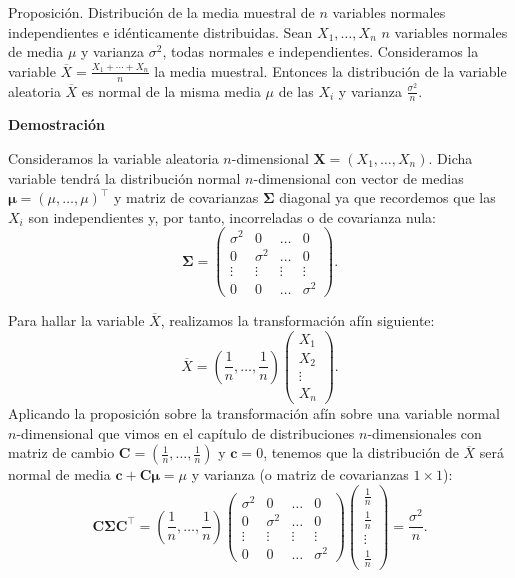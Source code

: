 \documentclass[]{book}
\begin{document}
Proposición. Distribución de la media muestral de \(n\) variables normales independientes e idénticamente distribuidas.
Sean \(X_1,\ldots, X_n\) \(n\) variables normales de media \(\mu\) y varianza \(\sigma^2\), todas normales e independientes. Consideramos la variable \(\overline{X}=\frac{X_1+\cdots + X_n}{n}\) la media muestral. Entonces la distribución de la variable aleatoria \(\overline{X}\) es normal de la misma media \(\mu\) de las \(X_i\) y varianza \(\frac{\sigma^2}{n}\).

\textbf{Demostración}

Consideramos la variable aleatoria \(n\)-dimensional \(\mathbf{X}=(X_1,\ldots,X_n)\). Dicha variable tendrá la distribución normal \(n\)-dimensional con vector de medias \(\mathbf{\mu}=(\mu,\ldots,\mu)^\top\) y matriz de covarianzas \(\mathbf{\Sigma}\) diagonal ya que recordemos que las \(X_i\) son independientes y, por tanto, incorreladas o de covarianza nula:
\[
\mathbf{\Sigma}=\begin{pmatrix}
\sigma^2 & 0 & \ldots & 0 \\
0 & \sigma^2 & \ldots & 0 \\
\vdots & \vdots & \vdots & \vdots \\
0 & 0 & \ldots & \sigma^2
\end{pmatrix}.
\]

Para hallar la variable \(\overline{X}\), realizamos la transformación afín siguiente:
\[
\overline{X}=\left(\frac{1}{n},\ldots,\frac{1}{n}\right)\begin{pmatrix} X_1 \\ X_2\\\vdots \\ X_n \end{pmatrix}.
\]
Aplicando la proposición sobre la transformación afín sobre una variable normal \(n\)-dimensional que vimos en el capítulo de distribuciones \(n\)-dimensionales con matriz de cambio \(\mathbf{C}=\left(\frac{1}{n},\ldots,\frac{1}{n}\right)\) y \(\mathbf{c}=0\), tenemos que la distribución de \(\overline{X}\) será normal de media \(\mathbf{c}+\mathbf{C}\mathbf{\mu} = \mu\) y varianza (o matriz de covarianzas \(1\times 1\)):
\[
\mathbf{C}\mathbf{\Sigma}\mathbf{C}^\top =\left(\frac{1}{n},\ldots,\frac{1}{n}\right)\begin{pmatrix}
\sigma^2 & 0 & \ldots & 0 \\
0 & \sigma^2 & \ldots & 0 \\
\vdots & \vdots & \vdots & \vdots \\
0 & 0 & \ldots & \sigma^2
\end{pmatrix} \begin{pmatrix}\frac{1}{n}\\\frac{1}{n}\\\vdots\\\frac{1}{n}\end{pmatrix} =\frac{\sigma^2}{n}.
\]
\end{document}

